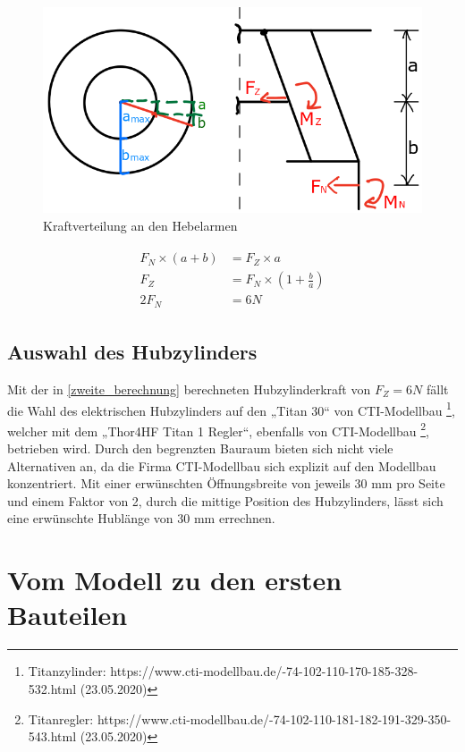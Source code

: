 \begin{figure}[h]
	\begin{center}
	\includegraphics[scale=0.5]{"Grafiken/Mechanikskizze.png"}
	\caption{Kraftverteilung an den Hebelarmen}
	\label{mechanikskizze}
	\end{center}
\end{figure}

\begin{eqnarray}
\label{zweite_berechnung}
\begin{split}
F_N \times(a+b) &= F_Z \times a \\
F_Z &= F_N \times (1 + \frac{b}{a}) \\
 2F_N &= 6N
\end{split}
\end{eqnarray}

\subsection{Auswahl des Hubzylinders}
Mit der in \eqref{zweite_berechnung} berechneten Hubzylinderkraft von $F_Z=6N$ fällt die Wahl des elektrischen Hubzylinders auf den „Titan 30“ von CTI-Modellbau \footnote[1]{Titanzylinder: https://www.cti-modellbau.de/-74-102-110-170-185-328-532.html (23.05.2020)}, welcher mit dem „Thor4HF Titan 1 Regler“, ebenfalls von CTI-Modellbau  \footnote[2]{Titanregler: https://www.cti-modellbau.de/-74-102-110-181-182-191-329-350-543.html (23.05.2020)}, betrieben wird. Durch den begrenzten Bauraum bieten sich nicht viele Alternativen an, da die Firma CTI-Modellbau sich explizit auf den Modellbau konzentriert.
Mit einer erwünschten Öffnungsbreite von jeweils 30 mm pro Seite und einem Faktor von 2, durch die mittige Position des Hubzylinders, lässt sich eine erwünschte Hublänge von 30 mm errechnen.

\section{Vom Modell zu den ersten Bauteilen}
